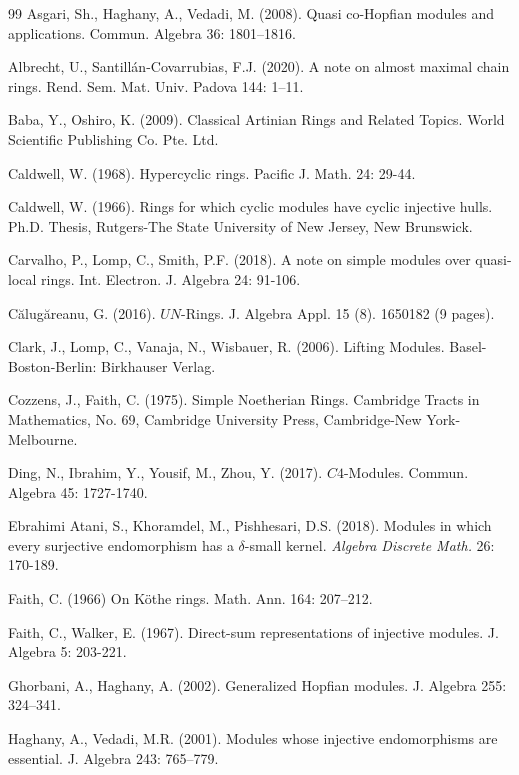 \documentclass{amsart}
\theoremstyle{plain}
\numberwithin{equation}{section}
\begin{document}
\begin{thebibliography}{99}
 Asgari, Sh., Haghany, A., Vedadi, M. (2008). Quasi co-Hopfian modules and applications.
Commun. Algebra 36: 1801--1816. 

 Albrecht, U., Santill{\'a}n-Covarrubias, F.J. (2020). A note on almost maximal chain rings. 
Rend. Sem. Mat. Univ. Padova 144: 1--11.


Baba, Y., Oshiro, K. (2009). Classical Artinian Rings and Related Topics. World Scientific Publishing Co. Pte. Ltd. 

Caldwell, W. (1968). Hypercyclic rings. Pacific J. Math. 24: 29-44. 

 Caldwell,
W. (1966). Rings for which cyclic modules have cyclic injective hulls. Ph.D. Thesis, Rutgers-The State University of New Jersey, New Brunswick. 

Carvalho, P., Lomp, C., Smith, P.F. (2018). A note on simple modules over quasi-local rings. Int. Electron. J. Algebra 24: 91-106. 

C\u{a}lug\u{a}reanu, G. (2016). $U N$-Rings. J. Algebra Appl. 15 (8). 1650182 (9 pages). 

 Clark,
J., Lomp, C., Vanaja, N., Wisbauer, R. (2006). Lifting Modules. Basel-Boston-Berlin: Birkhauser Verlag. 

Cozzens, J., Faith, C. (1975). Simple Noetherian Rings. Cambridge Tracts in Mathematics, No. 69, Cambridge University Press, Cambridge-New York-Melbourne.


 Ding, N., Ibrahim, Y., Yousif, M., Zhou, Y. (2017). $C 4$-Modules. Commun. Algebra 45: 1727-1740. 

 Ebrahimi Atani,
S., Khoramdel, M., Pishhesari, D.S. (2018). Modules in which every surjective endomorphism has a $\delta $-small kernel. \textit{Algebra Discrete Math. }26: 170-189. 

Faith, C. (1966) On K{\"o}the rings. Math. Ann. 164: 207--212. 

 Faith, C.,
Walker, E. (1967). Direct-sum representations of injective modules. J. Algebra 5: 203-221. 

Ghorbani, A., Haghany, A. (2002). Generalized Hopfian modules. J. Algebra 255: 324--341. 

Haghany, A., Vedadi, M.R. (2001). Modules whose injective endomorphisms are essential. J. Algebra 243: 765--779. 


\end{thebibliography}
\end{document}
